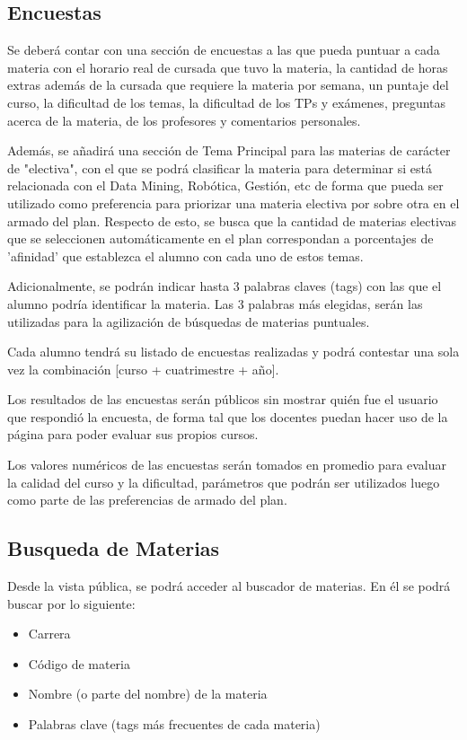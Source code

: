 \documentclass[a4paper]{article}
\begin{document}
\subsection{Encuestas}

Se deberá contar con una sección de encuestas a las que pueda puntuar a cada materia con el horario real de cursada que tuvo la materia, la cantidad de horas extras además de la cursada que requiere la materia por semana, un puntaje del curso, la dificultad de los temas, la dificultad de los TPs y exámenes, preguntas acerca de la materia, de los profesores y comentarios personales.

Además, se añadirá una sección de Tema Principal para las materias de carácter de "electiva", con el que se podrá clasificar la materia para determinar si está relacionada con el Data Mining, Robótica, Gestión, etc de forma que pueda ser utilizado como preferencia para priorizar una materia electiva por sobre otra en el armado del plan. Respecto de esto, se busca que la cantidad de materias electivas que se seleccionen automáticamente en el plan correspondan a porcentajes de 'afinidad' que establezca el alumno con cada uno de estos temas.

Adicionalmente, se podrán indicar hasta 3 palabras claves (tags) con las que el alumno podría identificar la materia. Las 3 palabras más elegidas, serán las utilizadas para la agilización de búsquedas de materias puntuales.

Cada alumno tendrá su listado de encuestas realizadas y podrá contestar una sola vez la combinación [curso + cuatrimestre + año].

Los resultados de las encuestas serán públicos sin mostrar quién fue el usuario que respondió la encuesta, de forma tal que los docentes puedan hacer uso de la página para poder evaluar sus propios cursos.

Los valores numéricos de las encuestas serán tomados en promedio para evaluar la calidad del curso y la dificultad, parámetros que podrán ser utilizados luego como parte de las preferencias de armado del plan.

\subsection{Busqueda de Materias}

Desde la vista pública, se podrá acceder al buscador de materias. En él se podrá buscar por lo siguiente:

\begin{itemize}
	\item Carrera
	\item Código de materia
	\item Nombre (o parte del nombre) de la materia
	\item Palabras clave (tags más frecuentes de cada materia)
\end{itemize}
\end{document}
